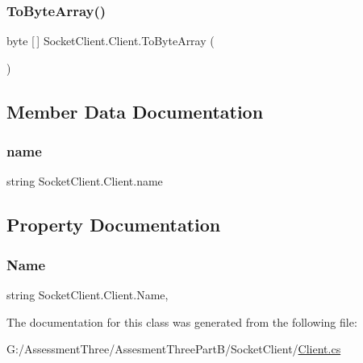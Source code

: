 \subsubsection{\texorpdfstring{To\+Byte\+Array()}{ToByteArray()}}
{\footnotesize\ttfamily byte \mbox{[}$\,$\mbox{]} Socket\+Client.\+Client.\+To\+Byte\+Array (\begin{DoxyParamCaption}{ }\end{DoxyParamCaption})\hspace{0.3cm}{\ttfamily [inline]}}



\subsection{Member Data Documentation}
\mbox{\label{class_socket_client_1_1_client_a162db8b8ce5e35c270876f905b71c8b8}} 
\subsubsection{\texorpdfstring{name}{name}}
{\footnotesize\ttfamily string Socket\+Client.\+Client.\+name\hspace{0.3cm}{\ttfamily [private]}}



\subsection{Property Documentation}
\mbox{\label{class_socket_client_1_1_client_a5eb03ddd11665bcd18f05f970433ec1b}} 
\subsubsection{\texorpdfstring{Name}{Name}}
{\footnotesize\ttfamily string Socket\+Client.\+Client.\+Name\hspace{0.3cm}{\ttfamily [get]}, {\ttfamily [set]}}



The documentation for this class was generated from the following file\+:\begin{DoxyCompactItemize}
\item 
G\+:/\+Assessment\+Three/\+Assesment\+Three\+Part\+B/\+Socket\+Client/\hyperlink{_socket_client_2_client_8cs}{Client.\+cs}\end{DoxyCompactItemize}
